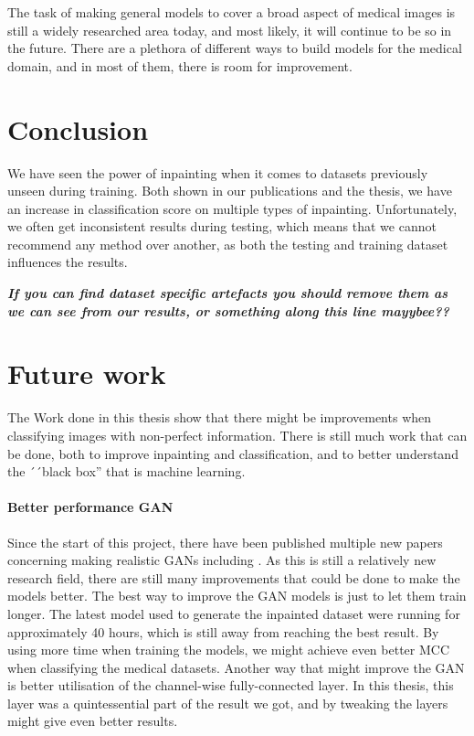 The task of making general models to cover a broad aspect of medical images is still a widely researched area today, and most likely, it will continue to be so in the future. There are a  plethora of different ways to build models for the medical domain, and in most of them, there is room for improvement.

\section{Conclusion}
We have seen the power of inpainting when it comes to datasets previously unseen during training. Both shown in our publications and the thesis, we have an increase in classification score on multiple types of inpainting.
Unfortunately, we often get inconsistent results during testing, which means that we cannot recommend any method over another, as both the testing and training dataset influences the results.

\textbf{\textit{If you can find dataset specific artefacts you should remove them as we can see from our results, or something along this line mayybee??}} \todo{ }



\section{Future work}
The Work done in this thesis show that there might be improvements when classifying images with non-perfect information. There is still much work that can be done, both to improve inpainting and classification, and to better understand the ´´black box'' that is machine learning. 

\paragraph{Better performance GAN}
Since the start of this project, there have been published multiple new papers concerning making realistic GANs including \cite{DBLP:journals/corr/abs-1809-11096} \cite{DBLP:journals/corr/abs-1812-04948}. As this is still a relatively new research field, there are still many improvements that could be done to make the models better.
The best way to improve the GAN models is just to let them train longer. The latest model used to generate the inpainted dataset were running for approximately 40 hours, which is still away from reaching the best result. By using more time when training the models, we might achieve even better MCC when classifying the medical datasets.
Another way that might improve the GAN is better utilisation of the channel-wise fully-connected layer. In this thesis, this layer was a quintessential part of the result we got, and by tweaking the layers might give even better results.

